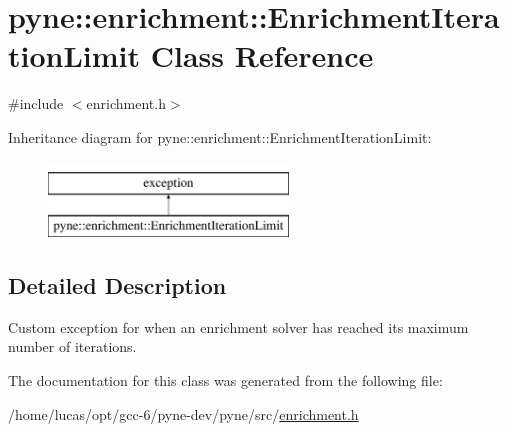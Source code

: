 \hypertarget{classpyne_1_1enrichment_1_1_enrichment_iteration_limit}{}\section{pyne\+:\+:enrichment\+:\+:Enrichment\+Iteration\+Limit Class Reference}
\label{classpyne_1_1enrichment_1_1_enrichment_iteration_limit}


{\ttfamily \#include $<$enrichment.\+h$>$}

Inheritance diagram for pyne\+:\+:enrichment\+:\+:Enrichment\+Iteration\+Limit\+:\begin{figure}[H]
\begin{center}
\leavevmode
\includegraphics[height=2.000000cm]{classpyne_1_1enrichment_1_1_enrichment_iteration_limit}
\end{center}
\end{figure}


\subsection{Detailed Description}
Custom exception for when an enrichment solver has reached its maximum number of iterations. 

The documentation for this class was generated from the following file\+:\begin{DoxyCompactItemize}
\item 
/home/lucas/opt/gcc-\/6/pyne-\/dev/pyne/src/\hyperlink{enrichment_8h}{enrichment.\+h}\end{DoxyCompactItemize}
